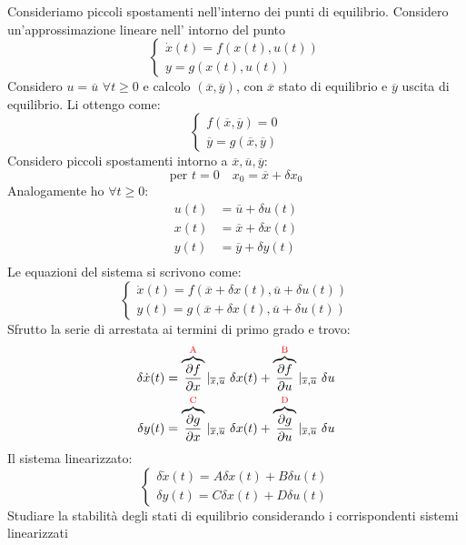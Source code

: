 	Consideriamo piccoli spostamenti nell'interno dei punti di equilibrio. Considero un'approssimazione lineare nell' intorno del punto
	\begin{equation*}
		\begin{cases}
			\dot{x}(t) = f(x(t),u(t))\\
			y = g(x(t),u(t))
		\end{cases}
	\end{equation*}
	Considero $ u=\overline{u} $ $ \forall t\geq0 $ e calcolo $ (\overline{x},\overline{y}) $, con $ \overline{x} $ stato di equilibrio e $ \overline{y} $ uscita di equilibrio. Li ottengo come:
	\begin{equation*}
		\begin{cases}
			f(\overline{x},\overline{y}) = 0\\
			\overline{y} = g(\overline{x},\overline{y})
		\end{cases}
	\end{equation*}
	Considero piccoli spostamenti intorno a $\overline{x},\overline{u},\overline{y}$:
	\[\text{per } t=0 \quad x_0 =\overline{x}+\delta x_0\]
	Analogamente ho $ \forall t\geq0 $:
	\begin{align}
		u(t)&=\overline{u}+\delta u(t)\\
		x(t)&=\overline{x}+\delta x(t)\\
		y(t)&=\overline{y}+\delta y(t)\\
	\end{align}
	Le equazioni del sistema si scrivono come:
	\begin{equation*}
		\begin{cases}
			\dot{x}(t) = f(\overline{x}+\delta x(t),\overline{u}+\delta u(t))\\
			y(t) = g(\overline{x}+\delta x(t),\overline{u}+\delta u(t))
		\end{cases}
	\end{equation*}
	Sfrutto la serie di  arrestata ai termini di primo grado e trovo:
	\begin{align}
		\delta\dot{x}(t) =\overbrace{ \frac{\partial f}{\partial x}}^\text{\textcolor{red}{A}}|_{\overline{x},\overline{u}}\,\,\delta x(t)+\overbrace{\frac{\partial f}{\partial u}}^\text{\textcolor{red}{B}}|_{\overline{x},\overline{u}}\,\,\delta u\\
		\delta y(t) =\overbrace{\frac{\partial g}{\partial x}}^\text{\textcolor{red}{C}}|_{\overline{x},\overline{u}}\,\,\delta x(t) +\overbrace{\frac{\partial g}{\partial u}}^\text{\textcolor{red}{D}}|_{\overline{x},\overline{u}}\,\,\delta u
	\end{align}
	Il sistema linearizzato:
	\begin{equation*}
		\begin{cases}
			\delta\dot{x}(t) = A\delta x(t) + B \delta u(t)\\
			\delta y (t) = C \delta x(t) + D\delta u(t)
		\end{cases}
	\end{equation*}
	Studiare la stabilità degli stati di equilibrio considerando i corrispondenti sistemi linearizzati
